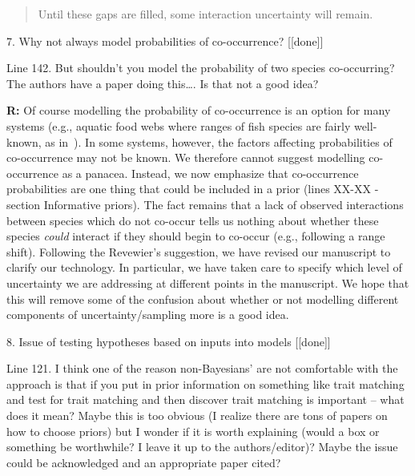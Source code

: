 \documentclass[12pt]{letter}
\newenvironment{refquote}{\bigskip \begin{it}}{\end{it}\smallskip}
\begin{document}
\begin{itemize}
			\begin{quotation}

				Until these gaps are filled, some interaction uncertainty will remain.

			\end{quotation}


	7. Why not always model probabilities of co-occurrence? [[done]]

		\begin{refquote}
		Line 142.  But shouldn’t you model the probability of two species co-occurring?  The authors have a paper doing this…. Is that not a good idea?
		\end{refquote}

		\textbf{R:} Of course modelling the probability of co-occurrence is an option for many systems (e.g., aquatic food webs where ranges of fish species are fairly well-known, as in~\citet{Gravel2013}). In some systems, however, the factors affecting probabilities of co-occurrence may not be known. We therefore cannot suggest modelling co-occurrence as a panacea. Instead, we now emphasize that co-occurrence probabilities are one thing that could be included in a prior (lines XX-XX - section Informative priors). 
		\smallskip
		The fact remains that a lack of observed interactions between species which do not co-occur tells us nothing about whether these species \emph{could} interact if they should begin to co-occur (e.g., following a range shift). Following the Revewier's suggestion, we have revised our manuscript to clarify our technology. In particular, we have taken care to specify which level of uncertainty we are addressing at different points in the manuscript. We hope that this will remove some of the confusion about whether or not modelling different components of uncertainty/sampling more is a good idea. 


	8. Issue of testing hypotheses based on inputs into models [[done]]

		\begin{refquote}
		Line 121.  I think one of the reason non-Bayesians’ are not comfortable with the approach is that if you put in prior information on something like trait matching and test for trait matching and then discover trait matching is important – what does it mean?  Maybe this is too obvious (I realize there are tons of papers on how to choose priors) but I wonder if it is worth explaining (would a box or something be worthwhile?  I leave it up to the authors/editor)?  Maybe the issue could be acknowledged and an appropriate paper cited?
		\end{refquote}


\end{itemize}
\end{document}
